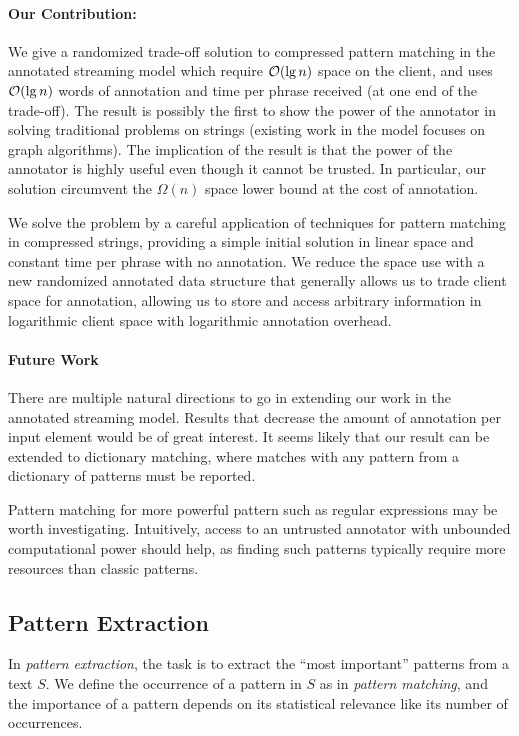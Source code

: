 \paragraph{Our Contribution: } 
We give a randomized trade-off solution to compressed pattern matching in the annotated streaming model which require $\mathcal{O}(\lg n)$ space on the client, and uses $\mathcal{O}(\lg n)$ words of annotation and time per phrase received (at one end of the trade-off). 
The result is possibly the first to show the power of the annotator in solving traditional problems on strings (existing work in the model focuses on graph algorithms). 
The implication of the result is that the power of the annotator is highly useful even though it cannot be trusted. In particular, our solution circumvent the $\Omega(n)$ space lower bound at the cost of annotation.

We solve the problem by a careful application of techniques for pattern matching in compressed strings, providing a simple initial solution in linear space and constant time per phrase with no annotation.
We reduce the space use with a new randomized annotated data structure that generally allows us to trade client space for annotation, allowing us to store and access arbitrary information in logarithmic client space with logarithmic annotation overhead.


\paragraph{Future Work}
There are multiple natural directions to go in extending our work in the annotated streaming model. Results that decrease the amount of annotation per input element would be of great interest. It seems likely that our result can be extended to dictionary matching, where matches with any pattern from a dictionary of patterns must be reported. 

Pattern matching for more powerful pattern such as regular expressions may be worth investigating. Intuitively, access to an untrusted annotator with unbounded computational power should help, as finding such patterns typically require more resources than classic patterns. %


\subsection{Pattern Extraction}
In \emph{pattern extraction}, the task is to extract the ``most important'' patterns from a text $S$.
We define the occurrence of a pattern in $S$ as in \emph{pattern matching}, and the importance of a pattern depends on its statistical relevance like its number of occurrences.

